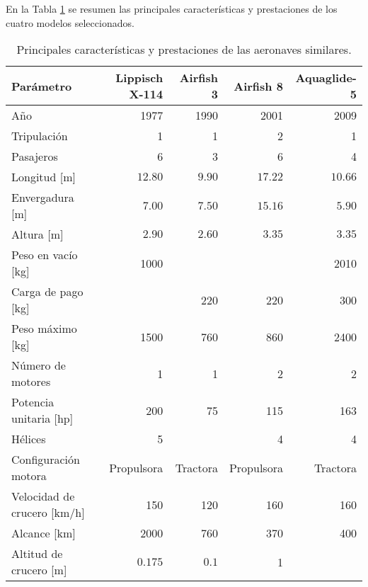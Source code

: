 \FloatBarrier

En la Tabla \ref{tab:similar} se resumen las principales características y prestaciones de los cuatro modelos seleccionados.

\begin{table}[ht]
\centering
\caption{Principales características y prestaciones de las aeronaves similares.}
\label{tab:similar}
\begin{tabular}{@{}lrrrr@{}}
\toprule
Parámetro                            & Lippisch X-114  & Airfish 3                 & Airfish 8  & Aquaglide-5      \\ \midrule
Año                                  & 1977            & 1990                      & 2001       & 2009             \\
Tripulación                          & 1               & 1                         & 2          & 1                \\
Pasajeros                            & 6               & 3                         & 6          & 4                \\ \hline
Longitud {[}m{]}                     & $12.80$           & $9.90$                      & $17.22$      & $10.66$            \\
Envergadura {[}m{]}                  & $7.00$            & $7.50$                      & $15.16$      & $5.90$             \\
Altura {[}m{]}                       & $2.90$            & $2.60$                      & $3.35$       & $3.35$             \\ \hline
Peso en vacío {[}kg{]}                         & 1000            &                           &            & 2010             \\
Carga de pago {[}kg{]}                          &                 & 220                       & 220        & 300              \\
Peso máximo {[}kg{]}                        & 1500            & 760                       & 860        & 2400             \\ \hline
Número de motores                    & 1               & 1                         & 2          & 2                \\
Potencia unitaria {[}hp{]}           & 200             & 75                        & 115        & 163              \\
Hélices                              & 5               &                           & 4          & 4                \\
Configuración motora                 & Propulsora      & Tractora                  & Propulsora & Tractora         \\ \hline
Velocidad de crucero {[}km/h{]} & 150             & 120                       & 160        & 160              \\
Alcance {[}km{]}                & 2000            & 760                       & 370        & 400              \\
Altitud de crucero {[}m{]} & $0.175$           & $0.1$                       & 1          &                  \\ \bottomrule
\end{tabular}
\end{table}

